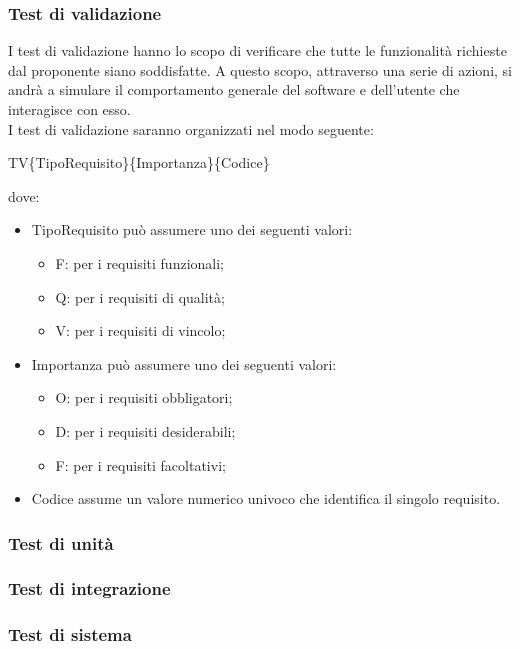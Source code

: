 \documentclass[PianoDiQualifica.tex]{subfiles}
\begin{document}
		\subsubsection{Test di validazione}
		I test di validazione hanno lo scopo di verificare che tutte le funzionalità richieste dal proponente siano soddisfatte. A questo scopo, attraverso una serie di
		azioni, si andrà a simulare il comportamento generale del software e dell'utente che interagisce con esso. \\
		I test di validazione saranno organizzati nel modo seguente:
		\begin{center} TV\{TipoRequisito\}\{Importanza\}\{Codice\} \end{center}
		dove:
		\begin{itemize}
			\item TipoRequisito può assumere uno dei seguenti valori:
			\begin{itemize}
				\item F: per i requisiti funzionali;
				\item Q: per i requisiti di qualità;
				\item V: per i requisiti di vincolo;
			\end{itemize}
			\item Importanza può assumere uno dei seguenti valori:
			\begin{itemize}
				\item O: per i requisiti obbligatori;
				\item D: per i requisiti desiderabili;
				\item F: per i requisiti facoltativi;
			\end{itemize}
			\item Codice assume un valore numerico univoco che identifica il singolo requisito.
		\end{itemize}
		
		\subsubsection{Test di unità}
		
		\subsubsection{Test di integrazione}
		
		\subsubsection{Test di sistema}
\end{document}
